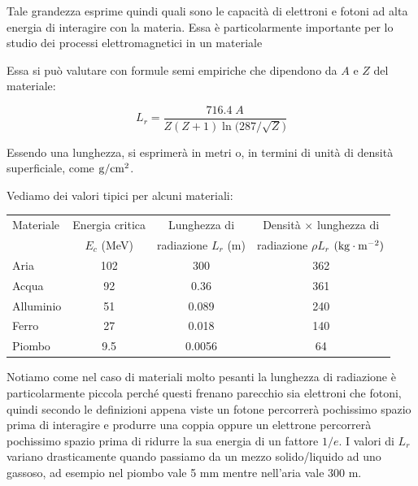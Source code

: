 Tale grandezza esprime quindi quali sono le capacità di elettroni e fotoni ad alta energia di interagire con la materia. Essa è particolarmente importante per lo studio dei processi elettromagnetici in un materiale

Essa si può valutare con formule semi empiriche che dipendono da $A$ e $Z$ del materiale:

\begin{equation*}
    L_r=\frac{716.4 \; A}{Z(Z+1)\ln \bigl( 287/\sqrt{Z} \bigr)}
\end{equation*}

Essendo una lunghezza, si esprimerà in metri o, in termini di unità di densità superficiale, come $\rm g/cm^2$.

Vediamo dei valori tipici per alcuni materiali:

\begin{center}
    \begin{tabular}{|l|c|c|c|}
      \hline
      Materiale & Energia critica & Lunghezza di & Densità $\times$ lunghezza di\\
      & $E_c$ (MeV) & radiazione $L_r$ (m) & radiazione $\rho L_r$ $(\rm kg \cdot m^{-2})$\\
      \hline
      Aria & 102 & 300 & 362\\
      \hline
      Acqua & 92 & 0.36 & 361\\
      \hline
      Alluminio & 51 & 0.089 & 240\\
      \hline
      Ferro & 27 & 0.018 & 140\\
      \hline
      Piombo & 9.5 & 0.0056 & 64\\
      \hline
    \end{tabular}
  \end{center}

Notiamo come nel caso di materiali molto pesanti la lunghezza di radiazione è particolarmente piccola perché questi frenano parecchio sia elettroni che fotoni, quindi secondo le definizioni appena viste un fotone percorrerà pochissimo spazio prima di interagire e produrre una coppia oppure un elettrone percorrerà pochissimo spazio prima di ridurre la sua energia di un fattore $1/e$. I valori di $L_r$ variano drasticamente quando passiamo da un mezzo solido/liquido ad uno gassoso, ad esempio nel piombo vale 5 mm mentre nell'aria vale 300 m.

